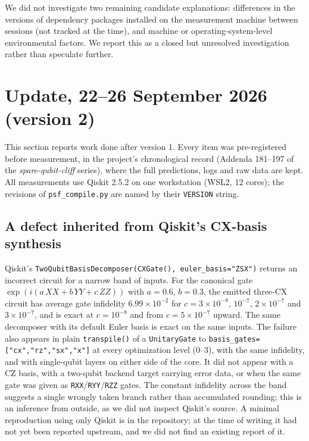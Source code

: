 \documentclass[11pt]{article}
\begin{document}
We did not investigate two remaining candidate explanations: differences
in the versions of dependency packages installed on the measurement
machine between sessions (not tracked at the time), and machine or
operating-system-level environmental factors. We report this as a
closed but unresolved investigation rather than speculate further.


\section{Update, 22--26 September 2026 (version 2)}
\label{sec:update}

This section reports work done after version 1. Every item was
pre-registered before measurement, in the project's chronological record
(Addenda 181--197 of the \emph{spare-qubit-cliff} series), where the full
predictions, logs and raw data are kept. All measurements use Qiskit
2.5.2 on one workstation (WSL2, 12 cores); the revisions of
\texttt{psf\_compile.py} are named by their \texttt{VERSION} string.

\subsection{A defect inherited from Qiskit's CX-basis synthesis}
\label{sec:update-defect}

Qiskit's \texttt{TwoQubitBasisDecomposer(CXGate(), euler\_basis="ZSX")}
returns an incorrect circuit for a narrow band of inputs. For the
canonical gate $\exp(i(a\,XX + b\,YY + c\,ZZ))$ with $a=0.6$, $b=0.3$, the
emitted three-CX circuit has average gate infidelity $6.99\times10^{-2}$
for $c = 3\times10^{-8}$, $10^{-7}$, $2\times10^{-7}$ and
$3\times10^{-7}$, and is exact at $c=10^{-8}$ and from $c=5\times10^{-7}$
upward. The same decomposer with its default Euler basis is exact on the
same inputs. The failure also appears in plain
\texttt{transpile()} of a \texttt{UnitaryGate} to
\texttt{basis\_gates=["cx","rz","sx","x"]} at every optimization level
(0--3), with the same infidelity, and with single-qubit layers on either
side of the core. It did not appear with a CZ basis, with a two-qubit
backend target carrying error data, or when the same gate was given as
\texttt{RXX}/\texttt{RYY}/\texttt{RZZ} gates. The constant infidelity
across the band suggests a single wrongly taken branch rather than
accumulated rounding; this is an inference from outside, as we did not
inspect Qiskit's source. A minimal reproduction using only Qiskit is in
the repository; at the time of writing it had not yet been reported
upstream, and we did not find an existing report of it.
\end{document}
